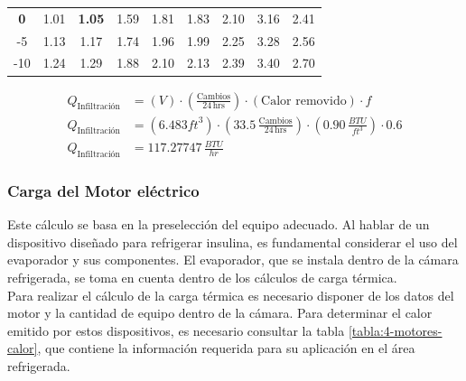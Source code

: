 \begin{table}[H]
\begin{tabular}{ccccccccc}
 			{\color[HTML]{DA8292} \textbf{0}}                                                                             & 1.01 & {\color[HTML]{DA8292} \textbf{1.05}} & 1.59       & 1.81      & 1.83       & 2.10      & 3.16       & 2.41       \\
 			-5                                                                                                            & 1.13 & 1.17                                 & 1.74       & 1.96      & 1.99       & 2.25      & 3.28       & 2.56       \\
 			-10                                                                                                           & 1.24 & 1.29                                 & 1.88       & 2.10      & 2.13       & 2.39      & 3.40       & 2.70       \\ \hline
 		\end{tabular}
 	\end{table}
 	
 	
 	
 	\begin{equation}
 		\begin{aligned}
 			Q_{\text{Infiltración}} &= (V) \cdot \left( \frac{\text{Cambios}}{24 \, \text{hrs}} \right) \cdot (\text{Calor removido}) \cdot f \\
 			Q_{\text{Infiltración}} &= (6.483 {ft}^3) \cdot \left( 33.5 \, \frac{\text{Cambios}}{24 \, \text{hrs}} \right) \cdot \left(0.90  \, \frac{{BTU}}{{ft}^3} \right) \cdot 0.6 \\
 			Q_{\text{Infiltración}} &=117.27747\, \frac{{BTU}}{{hr}}
 		\end{aligned}
 	\end{equation}
 	
 	
 	
 	\subsubsection{Carga del Motor eléctrico}
 	
 	Este cálculo se basa en la preselección del equipo adecuado. Al hablar de un dispositivo diseñado para refrigerar insulina, es fundamental considerar el uso del evaporador y sus componentes. El evaporador, que se instala dentro de la cámara refrigerada, se toma en cuenta dentro de los cálculos de carga térmica.\\
 	Para realizar el cálculo de la carga térmica es necesario disponer de los datos del motor y la cantidad de equipo dentro de la cámara. Para determinar el calor emitido por estos dispositivos, es necesario consultar la tabla \ref{tabla:4-motores-calor}, que contiene la información requerida para su aplicación en el área refrigerada.
 	

